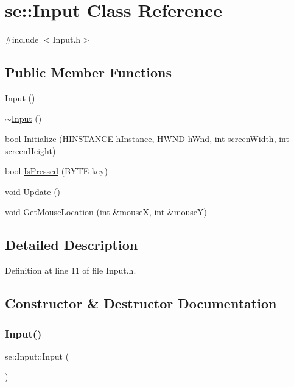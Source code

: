 \hypertarget{classse_1_1_input}{}\section{se\+:\+:Input Class Reference}
\label{classse_1_1_input}


{\ttfamily \#include $<$Input.\+h$>$}

\subsection*{Public Member Functions}
\begin{DoxyCompactItemize}
\item 
\mbox{\hyperlink{classse_1_1_input_a9302103358f3dc3e059df897b0174fc5}{Input}} ()
\item 
\mbox{\hyperlink{classse_1_1_input_ad856d30ccdab1d654eb59b0895ade26c}{$\sim$\+Input}} ()
\item 
bool \mbox{\hyperlink{classse_1_1_input_a3f76e2bdfbd322766cc08a9ddda9727a}{Initialize}} (H\+I\+N\+S\+T\+A\+N\+CE h\+Instance, H\+W\+ND h\+Wnd, int screen\+Width, int screen\+Height)
\item 
bool \mbox{\hyperlink{classse_1_1_input_a7f63b679d5f26fd7022be7028218a3da}{Is\+Pressed}} (B\+Y\+TE key)
\item 
void \mbox{\hyperlink{classse_1_1_input_a823406d60664b299791026e869abe121}{Update}} ()
\item 
void \mbox{\hyperlink{classse_1_1_input_a6088639b8f77563aad712a7c9708edf1}{Get\+Mouse\+Location}} (int \&mouseX, int \&mouseY)
\end{DoxyCompactItemize}


\subsection{Detailed Description}


Definition at line 11 of file Input.\+h.



\subsection{Constructor \& Destructor Documentation}
\mbox{\label{classse_1_1_input_a9302103358f3dc3e059df897b0174fc5}} 
\subsubsection{\texorpdfstring{Input()}{Input()}}
{\footnotesize\ttfamily se\+::\+Input\+::\+Input (\begin{DoxyParamCaption}{ }\end{DoxyParamCaption})}

